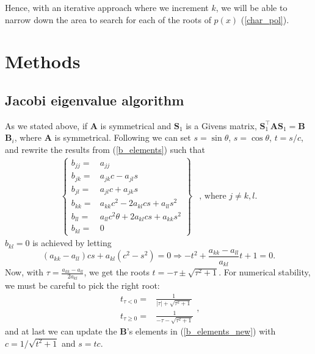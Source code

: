 \documentclass[]{article}
\begin{document}
Hence, with an iterative approach where we increment $k$, we will be able to narrow down the area to search for each of the roots of $p(x)$ (\ref{char_pol}).

\section{Methods}

\subsection{Jacobi eigenvalue algorithm}
As we stated above, if $\mathbf{A}$ is symmetrical and $\mathbf{S}_1$ is a Givens matrix, $\mathbf{S}_1^\intercal \mathbf{A} \mathbf{S}_1 = \mathbf{B}$  $\mathbf{B}_i$, where $\mathbf{A}$ is symmetrical. Following \cite{fys4150-p2} we can set $s = \sin \theta$, $s = \cos \theta$, $t = s/c$, and rewrite the results from (\ref{b_elements}) such that
\begin{equation}
\label{b_elements_new}
\begin{array}{cc}
\left\{
\begin{aligned}
b_{jj} =& a_{jj} \\
b_{jk} =& a_{jk}c - a_{jl}s \\
b_{jl} =& a_{jl}c + a_{jk}s \\
b_{kk} =& a_{kk}c^2 - 2a_{kl}cs +a_{ll}s^2 \\
b_{ll} =& a_{ll}c^2\theta +2a_{kl}cs +a_{kk}s^2 \\
b_{kl} =& 0 
\end{aligned}
\right\} &
\text{, where } j \ne k,l.
\end{array}
\end{equation}
$b_{kl} = 0$ is achieved by letting
\[
	(a_{kk}-a_{ll})cs +a_{kl}(c^2-s^2) = 0 \Rightarrow -t^2 + \frac{a_{kk}-a_{ll}}{a_{kl}}t + 1 = 0.
\]
Now, with $\tau = \frac{a_{kk}-a_{ll}}{2a_{kl}}$, we get the roots $t = -\tau \pm \sqrt{\tau^2 + 1}$. For numerical stability, we must be careful to pick the right root:
\begin{equation*}
\begin{aligned}
	t_{\tau<0} =& \frac{1}{|\tau| + \sqrt{\tau^2 + 1}} \\
	t_{\tau \ge 0} =& \frac{1}{-\tau - \sqrt{\tau^2 + 1}}
\end{aligned},
\end{equation*}
and at last we can update the $\mathbf{B}$'s elements in (\ref{b_elements_new}) with $c = 1/\sqrt{t^2 + 1}$ and $s = tc$.
\end{document}
